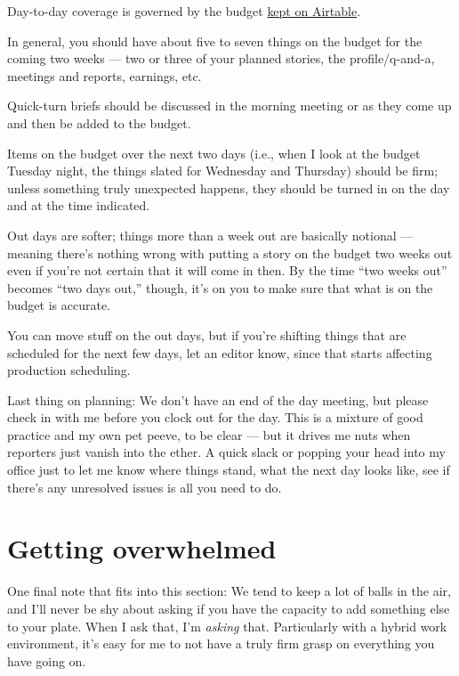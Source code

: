 \documentclass[
  12pt,
  american,
  letterpaperpaper,
  extrafontsizes,onecolumn,openright
  ]{memoir}
\begin{document}
Day-to-day coverage is governed by the budget \href{https://airtable.com/appd845fCRPfzGyrt/tblx8KlY4D5nLOKB3/viwcJlT5urTqgUus1?blocks=hide}{kept on Airtable}.

In general, you should have about five to seven things on the budget for the coming two weeks --- two or three of your planned stories, the profile/q-and-a, meetings and reports, earnings, etc.~

Quick-turn briefs should be discussed in the morning meeting or as they come up and then be added to the budget.

Items on the budget over the next two days (i.e., when I look at the budget Tuesday night, the things slated for Wednesday and Thursday) should be firm; unless something truly unexpected happens, they should be turned in on the day and at the time indicated.~

Out days are softer; things more than a week out are basically notional --- meaning there's nothing wrong with putting a story on the budget two weeks out even if you're not certain that it will come in then. By the time \enquote{two weeks out} becomes \enquote{two days out,} though, it's on you to make sure that what is on the budget is accurate.

You can move stuff on the out days, but if you're shifting things that are scheduled for the next few days, let an editor know, since that starts affecting production scheduling.

Last thing on planning: We don't have an end of the day meeting, but please check in with me before you clock out for the day. This is a mixture of good practice and my own pet peeve, to be clear --- but it drives me nuts when reporters just vanish into the ether. A quick slack or popping your head into my office just to let me know where things stand, what the next day looks like, see if there's any unresolved issues is all you need to do.

\hypertarget{getting-overwhelmed}{%
\section*{Getting overwhelmed}\label{getting-overwhelmed}}

One final note that fits into this section: We tend to keep a lot of balls in the air, and I'll never be shy about asking if you have the capacity to add something else to your plate. When I ask that, I'm \emph{asking} that. Particularly with a hybrid work environment, it's easy for me to not have a truly firm grasp on everything you have going on.
\end{document}
